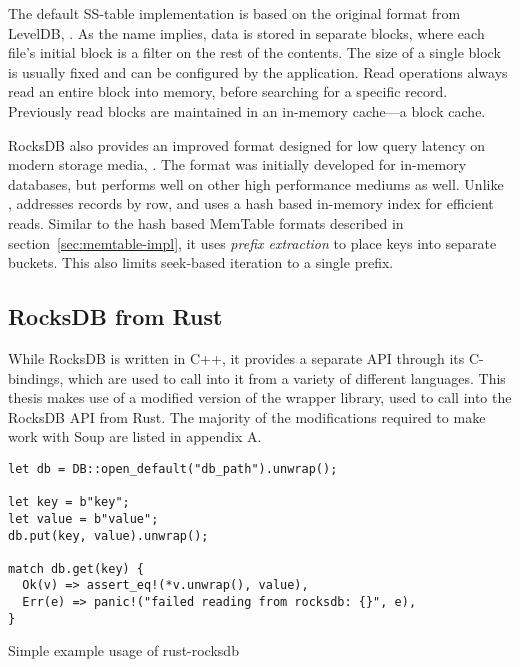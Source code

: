 The default SS-table implementation is based on the original format from
LevelDB,
.
As the name implies, data is stored in separate blocks, where each file's
initial block is a filter on the rest of the contents. The size of a single
block is usually fixed and can be configured by the application. Read operations
always read an entire block into memory, before searching for a specific record.
Previously read blocks are maintained in an in-memory cache---a block cache.

RocksDB also provides an improved format designed for low query latency on
modern storage media,
.
The format was initially developed for in-memory databases, but performs well on
other high performance mediums as well. Unlike ,
 addresses records by row, and uses a hash based in-memory
index for efficient reads. Similar to the hash based MemTable formats described
in section~\ref{sec:memtable-impl}, it uses \textit{prefix extraction} to place
keys into separate buckets. This also limits seek-based iteration to a single
prefix.

\subsection{RocksDB from Rust}\label{sec:rust-rocksdb}

While RocksDB is written in C++, it provides a separate API through its
C-bindings, which are used to call into it from a variety of different
languages.
This thesis makes use of a modified version of the
 wrapper
library, used to call into the RocksDB API from Rust. The majority of the
modifications required to make  work with Soup are listed in
appendix A.

\begin{listing}[H]
  \begin{verbatim}
let db = DB::open_default("db_path").unwrap();

let key = b"key";
let value = b"value";
db.put(key, value).unwrap();

match db.get(key) {
  Ok(v) => assert_eq!(*v.unwrap(), value),
  Err(e) => panic!("failed reading from rocksdb: {}", e),
}
  \end{verbatim}

  \caption{Simple example usage of rust-rocksdb}\label{lst:rocksdb-rust}
\end{listing}


